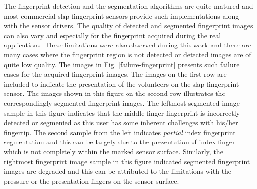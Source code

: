 The fingerprint detection and the segmentation algorithms are quite matured and most commercial slap fingerprint sensors provide such implementations along with the sensor drivers. The quality of detected and segmented fingerprint images can also vary and especially for the fingerprint acquired during the real applications. These limitations were also observed during this work and there are many cases where the fingerprint region is not detected or detected images are of quite low quality. The images in Fig. \ref{failure-fingerprint} presents such failure cases for the acquired fingerprint images. The images on the first row are included to indicate the presentation of the volunteers on the slap fingerprint sensor.  The images shown in this figure on the second row illustrates the correspondingly segmented fingerprint images. The leftmost segmented image sample in this figure indicates that the middle finger fingerprint is incorrectly detected or segmented as this user has some inherent challenges with his/her fingertip. The second sample from the left indicates \textit{partial} index fingerprint segmentation and this can be largely due to the presentation of index finger which is not completely within the marked sensor surface.  Similarly, the rightmost fingerprint image sample in this figure indicated segmented fingerprint images are degraded and this can be attributed to the limitations with the pressure or the presentation fingers on the sensor surface. 